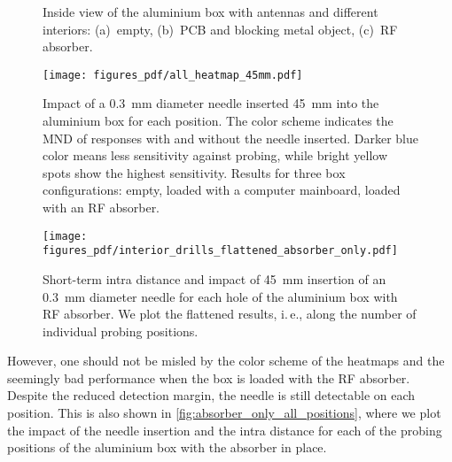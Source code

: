\documentclass[conference]{IEEEtran}
\makeatletter
\newcommand{\ie}{i.\@\,e.\@\xspace}
\makeatother
\begin{document}
\begin{figure}[t]
\hspace*{\fill}
\hfill
{}
\hfill
{}
\hspace*{\fill}\caption{Inside view of the aluminium box with antennas and different interiors: (a)~empty, (b)~PCB and blocking metal object, (c)~RF absorber.}
\label{fig:interior_fotos}
\end{figure}

\begin{figure}
\centering
\texttt{[image: figures\_pdf/all\_heatmap\_45mm.pdf]}
\caption{Impact of a \SI{0.3}{\mm} diameter needle inserted \SI{45}{\mm} into the aluminium box for each position. The color scheme indicates the MND of responses with and without the needle inserted.  Darker blue color means less sensitivity against probing, while bright yellow spots show the highest sensitivity. Results for three box configurations: empty, loaded with a computer mainboard, loaded with an RF absorber.}
\label{fig:interior_heatmaps}
\end{figure}

\begin{figure}
\centering
\texttt{[image: figures\_pdf/interior\_drills\_flattened\_absorber\_only.pdf]}
\caption{Short-term intra distance and impact of \SI{45}{\mm} insertion of an \SI{0.3}{\mm} diameter needle for each hole of the aluminium box with RF absorber. We plot the flattened results, \ie, along the number of individual probing positions.}
\label{fig:absorber_only_all_positions}
\end{figure}

However, one should not be misled by the color scheme of the heatmaps and the seemingly bad performance when the box is loaded with the RF absorber. Despite the reduced detection margin, the needle is still detectable on each position. This is also shown in \autoref{fig:absorber_only_all_positions}, where we plot the impact of the needle insertion and the intra distance for each of the probing positions of the aluminium box with the absorber in place.
\end{document}
